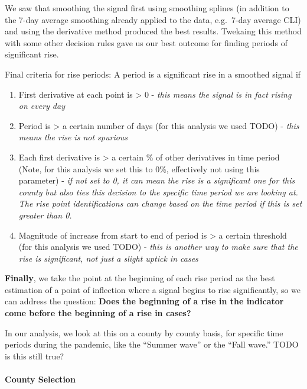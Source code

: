 \documentclass[]{article}
\let\oldparagraph\paragraph
\renewcommand{\paragraph}[1]{\oldparagraph{#1}\mbox{}}
\begin{document}
We saw that smoothing the signal first using smoothing splines (in
addition to the 7-day average smoothing already applied to the data,
e.g.~7-day average CLI) and using the derivative method produced the
best results. Twekaing this method with some other decision rules gave
us our best outcome for finding periods of significant rise.

Final criteria for rise periods: A period is a significant rise in a
smoothed signal if

\begin{enumerate}
\def\labelenumi{\arabic{enumi}.}
\item
  First derivative at each point is \textgreater{} 0 - \emph{this means
  the signal is in fact rising on every day}
\item
  Period is \textgreater{} a certain number of days (for this analysis
  we used TODO) - \emph{this means the rise is not spurious}
\item
  Each first derivative is \textgreater{} a certain \% of other
  derivatives in time period (Note, for this analysis we set this to
  0\%, effectively not using this parameter) - \emph{if not set to 0, it
  can mean the rise is a significant one for this county but also ties
  this decision to the specific time period we are looking at. The rise
  point identifications can change based on the time period if this is
  set greater than 0.}
\item
  Magnitude of increase from start to end of period is \textgreater{} a
  certain threshold (for this analysis we used TODO) - \emph{this is
  another way to make sure that the rise is significant, not just a
  slight uptick in cases}
\end{enumerate}

\textbf{Finally}, we take the point at the beginning of each rise period
as the best estimation of a point of inflection where a signal begins to
rise significantly, so we can address the question: \textbf{Does the
beginning of a rise in the indicator come before the beginning of a rise
in cases?}

In our analysis, we look at this on a county by county basis, for
specific time periods during the pandemic, like the ``Summer wave'' or
the ``Fall wave.'' TODO is this still true?

\hypertarget{county-selection}{%
\paragraph{County Selection}\label{county-selection}}
\end{document}
